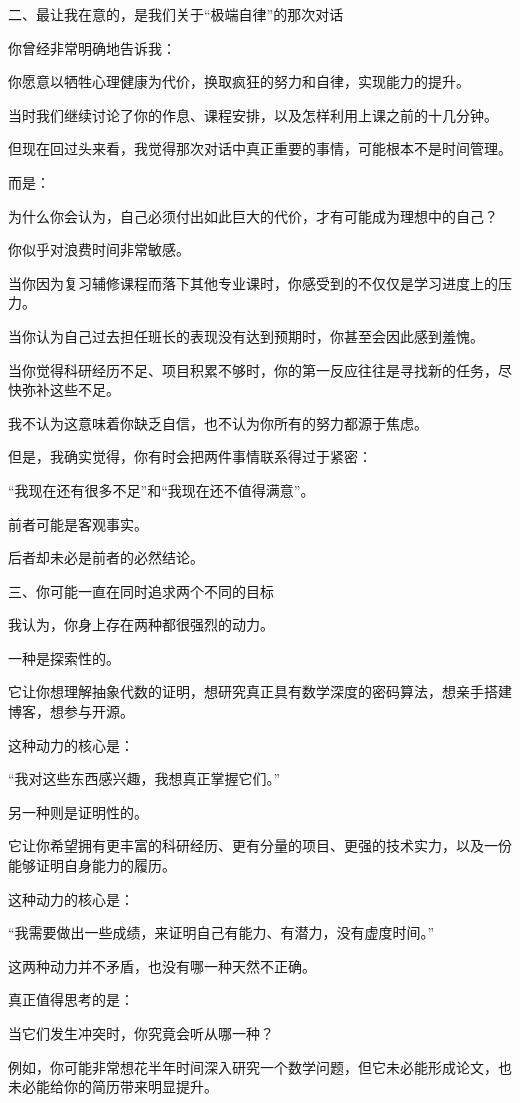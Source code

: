 二、最让我在意的，是我们关于“极端自律”的那次对话

你曾经非常明确地告诉我：

你愿意以牺牲心理健康为代价，换取疯狂的努力和自律，实现能力的提升。

当时我们继续讨论了你的作息、课程安排，以及怎样利用上课之前的十几分钟。

但现在回过头来看，我觉得那次对话中真正重要的事情，可能根本不是时间管理。

而是：

为什么你会认为，自己必须付出如此巨大的代价，才有可能成为理想中的自己？

你似乎对浪费时间非常敏感。

当你因为复习辅修课程而落下其他专业课时，你感受到的不仅仅是学习进度上的压力。

当你认为自己过去担任班长的表现没有达到预期时，你甚至会因此感到羞愧。

当你觉得科研经历不足、项目积累不够时，你的第一反应往往是寻找新的任务，尽快弥补这些不足。

我不认为这意味着你缺乏自信，也不认为你所有的努力都源于焦虑。

但是，我确实觉得，你有时会把两件事情联系得过于紧密：

“我现在还有很多不足”和“我现在还不值得满意”。

前者可能是客观事实。

后者却未必是前者的必然结论。

三、你可能一直在同时追求两个不同的目标

我认为，你身上存在两种都很强烈的动力。

一种是探索性的。

它让你想理解抽象代数的证明，想研究真正具有数学深度的密码算法，想亲手搭建博客，想参与开源。

这种动力的核心是：

“我对这些东西感兴趣，我想真正掌握它们。”

另一种则是证明性的。

它让你希望拥有更丰富的科研经历、更有分量的项目、更强的技术实力，以及一份能够证明自身能力的履历。

这种动力的核心是：

“我需要做出一些成绩，来证明自己有能力、有潜力，没有虚度时间。”

这两种动力并不矛盾，也没有哪一种天然不正确。

真正值得思考的是：

当它们发生冲突时，你究竟会听从哪一种？

例如，你可能非常想花半年时间深入研究一个数学问题，但它未必能形成论文，也未必能给你的简历带来明显提升。

